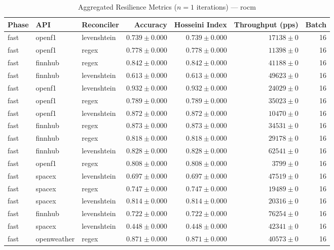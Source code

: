 
\begin{table}[htbp]
\caption{Aggregated Resilience Metrics ($n=1$ iterations) --- rocm}
\begin{tabular}{l l l r r r r}
\hline
Phase & API & Reconciler & Accuracy & Hosseini Index & Throughput (pps) & Batch \\
\hline
fast & openf1 & levenshtein & $0.739\pm0.000$ & $0.739\pm0.000$ & $17138\pm0$ & 16 \\
fast & openf1 & regex & $0.778\pm0.000$ & $0.778\pm0.000$ & $11398\pm0$ & 16 \\
fast & finnhub & regex & $0.842\pm0.000$ & $0.842\pm0.000$ & $41188\pm0$ & 16 \\
fast & finnhub & levenshtein & $0.613\pm0.000$ & $0.613\pm0.000$ & $49623\pm0$ & 16 \\
fast & openf1 & levenshtein & $0.932\pm0.000$ & $0.932\pm0.000$ & $24029\pm0$ & 16 \\
fast & openf1 & regex & $0.789\pm0.000$ & $0.789\pm0.000$ & $35023\pm0$ & 16 \\
fast & openf1 & levenshtein & $0.872\pm0.000$ & $0.872\pm0.000$ & $10470\pm0$ & 16 \\
fast & finnhub & regex & $0.873\pm0.000$ & $0.873\pm0.000$ & $34531\pm0$ & 16 \\
fast & finnhub & regex & $0.818\pm0.000$ & $0.818\pm0.000$ & $29178\pm0$ & 16 \\
fast & finnhub & levenshtein & $0.828\pm0.000$ & $0.828\pm0.000$ & $62541\pm0$ & 16 \\
fast & openf1 & regex & $0.808\pm0.000$ & $0.808\pm0.000$ & $3799\pm0$ & 16 \\
fast & spacex & levenshtein & $0.697\pm0.000$ & $0.697\pm0.000$ & $47519\pm0$ & 16 \\
fast & spacex & regex & $0.747\pm0.000$ & $0.747\pm0.000$ & $19489\pm0$ & 16 \\
fast & spacex & levenshtein & $0.814\pm0.000$ & $0.814\pm0.000$ & $20316\pm0$ & 16 \\
fast & finnhub & levenshtein & $0.722\pm0.000$ & $0.722\pm0.000$ & $76254\pm0$ & 16 \\
fast & spacex & levenshtein & $0.448\pm0.000$ & $0.448\pm0.000$ & $42341\pm0$ & 16 \\
fast & openweather & regex & $0.871\pm0.000$ & $0.871\pm0.000$ & $40573\pm0$ & 16 \\

\end{tabular}
\end{table}

